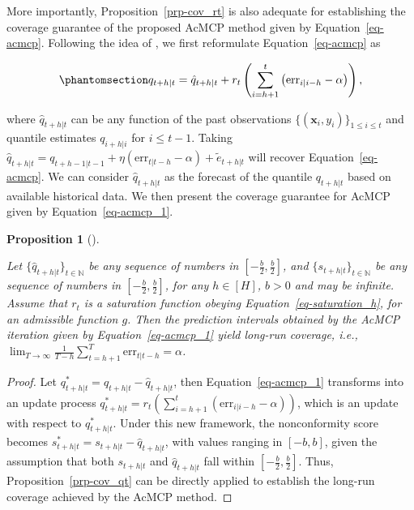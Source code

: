 \documentclass[
  11pt,
  a4paper,
]{article}
\theoremstyle{plain}
\newtheorem{proposition}{Proposition}[section]
\theoremstyle{plain}
\theoremstyle{remark}
\begin{document}
More importantly, Proposition~\ref{prp-cov_rt} is also adequate for
establishing the coverage guarantee of the proposed AcMCP method given
by Equation~\ref{eq-acmcp}. Following the idea of
\textcite{angelopoulos2024}, we first reformulate
Equation~\ref{eq-acmcp} as

\begin{equation}\phantomsection\label{eq-acmcp_1}{
q_{t+h|t}=\hat{q}_{t+h|t}+r_t\left(\sum_{i=h+1}^t \left(\mathrm{err}_{i|i-h}-\alpha\right)\right),
}\end{equation}

where \(\hat{q}_{t+h|t}\) can be any function of the past observations
\(\{(\bm{x}_i, y_i)\}_{1 \leq i \leq t}\) and quantile estimates
\(q_{i+h|i}\) for \(i \leq t-1\). Taking
\(\hat{q}_{t+h|t}=q_{t+h-1|t-1}+\eta \left(\mathrm{err}_{t|t-h}-\alpha\right)+\tilde{e}_{t+h|t}\)
will recover Equation~\ref{eq-acmcp}. We can consider
\(\hat{q}_{t+h|t}\) as the forecast of the quantile \(q_{t+h|t}\) based
on available historical data. We then present the coverage guarantee for
AcMCP given by Equation~\ref{eq-acmcp_1}.

\begin{proposition}[]\protect\hypertarget{prp-cov_acmcp}{}\label{prp-cov_acmcp}

Let \(\{\hat{q}_{t+h|t}\}_{t\in\mathbb{N}}\) be any sequence of numbers
in \([-\frac{b}{2}, \frac{b}{2}]\), and
\(\{s_{t+h|t}\}_{t\in\mathbb{N}}\) be any sequence of numbers in
\([-\frac{b}{2},\frac{b}{2}]\), for any \(h\in[H]\), \(b>0\) and may be
infinite. Assume that \(r_t\) is a saturation function obeying
Equation~\ref{eq-saturation_h}, for an admissible function \(g\). Then
the prediction intervals obtained by the AcMCP iteration given by
Equation~\ref{eq-acmcp_1} yield long-run coverage, i.e.,
\(\lim _{T \rightarrow \infty} \frac{1}{T-h} \sum_{t=h+1}^T \mathrm{err}_{t|t-h} = \alpha\).

\end{proposition}

\begin{proof}
Let \(q_{t+h|t}^{*}=q_{t+h|t}-\hat{q}_{t+h|t}\), then
Equation~\ref{eq-acmcp_1} transforms into an update process
\(q_{t+h|t}^{*}=r_t\left(\sum_{i=h+1}^t \left(\mathrm{err}_{i|i-h}-\alpha\right)\right)\),
which is an update with respect to \(q_{t+h|t}^{*}\). Under this new
framework, the nonconformity score becomes
\(s_{t+h|t}^{*}=s_{t+h|t}-\hat{q}_{t+h|t}\), with values ranging in
\([-b,b]\), given the assumption that both \(s_{t+h|t}\) and
\(\hat{q}_{t+h|t}\) fall within \([-\frac{b}{2},\frac{b}{2}]\). Thus,
Proposition~\ref{prp-cov_qt} can be directly applied to establish the
long-run coverage achieved by the AcMCP method.
\end{proof}
\end{document}

